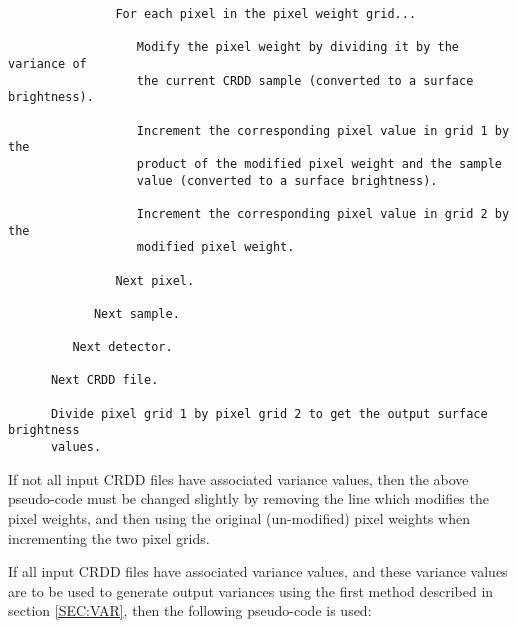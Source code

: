 \begin{verbatim}
               For each pixel in the pixel weight grid...

                  Modify the pixel weight by dividing it by the variance of
                  the current CRDD sample (converted to a surface brightness).

                  Increment the corresponding pixel value in grid 1 by the
                  product of the modified pixel weight and the sample
                  value (converted to a surface brightness).

                  Increment the corresponding pixel value in grid 2 by the
                  modified pixel weight.

               Next pixel.

            Next sample.

         Next detector.

      Next CRDD file.

      Divide pixel grid 1 by pixel grid 2 to get the output surface brightness
      values.

\end{verbatim}

If not all input CRDD files have associated variance values, then the above
pseudo-code must be changed slightly by removing the line which modifies the
pixel weights, and then using the original (un-modified) pixel weights when
incrementing the two pixel grids.

If all input CRDD files have associated variance values, and these variance
values are to be used to generate output variances using the first method
described in section \ref {SEC:VAR}, then the following pseudo-code
is used:


